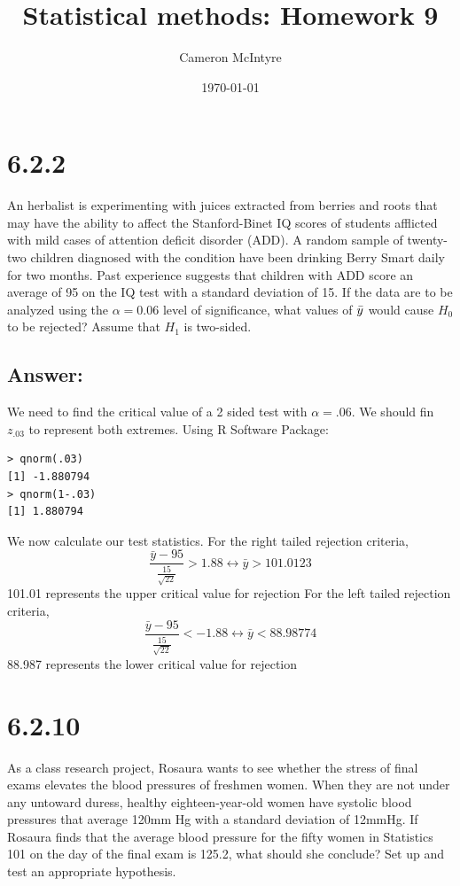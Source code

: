 \documentclass[svgnames]{article}
\title{Statistical methods: Homework 9}
\author{Cameron McIntyre}
\date{\today}
\begin{document}
\maketitle

\section{6.2.2}

An herbalist is experimenting with juices extracted from berries and roots that may have the ability to affect the Stanford-Binet IQ scores of students afflicted with mild cases of attention deficit disorder (ADD). A random sample of twenty-two children diagnosed with the condition have been drinking Berry Smart daily for two months. Past experience suggests that children with ADD score an average of 95 on the IQ test with a standard deviation of 15. If the data are to be analyzed using the $\alpha = 0.06$ level of significance, what values of $\Bar{y}$ would cause $H_0$ to be rejected? Assume that $H_1$ is two-sided.

\subsection*{Answer:}
We need to find the critical value of a 2 sided test with $\alpha=.06$. We should fin $z_{.03}$ to represent both extremes. 
Using R Software Package:

\begin{lstlisting}
> qnorm(.03)
[1] -1.880794
> qnorm(1-.03)
[1] 1.880794
\end{lstlisting}

We now calculate our test statistics.
For the right tailed rejection criteria,
$$\frac{\bar{y}-95}{\frac{15}{\sqrt{22}}}>1.88 \leftrightarrow \bar{y} > 101.0123$$
101.01 represents the upper critical value for rejection
For the left tailed rejection criteria,
$$\frac{\bar{y}-95}{\frac{15}{\sqrt{22}}}<-1.88 \leftrightarrow \bar{y} < 88.98774$$
88.987 represents the lower critical value for rejection

\section{6.2.10}
 As a class research project, Rosaura wants to see whether the stress of final exams elevates the blood pressures of freshmen women. When they are not under any untoward duress, healthy eighteen-year-old women have systolic blood pressures that average 120mm Hg with a standard deviation of 12mmHg. If Rosaura finds that the average blood pressure for the fifty women in Statistics 101 on the day of the final exam is 125.2, what should she conclude? Set up and test an appropriate hypothesis.
\end{document}
